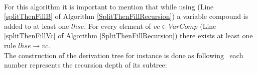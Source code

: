 \noindent
{}
\\
For this algorithm it is important to mention that while using  (Line \ref{splitThenFillB} of Algorithm \ref{SplitThenFillRecursion}) a variable compound is added to at least one $lhse$. For every element of $vc \in VarComp$ (Line \ref{splitThenFillVc} of Algorithm \ref{SplitThenFillRecursion}) there exists at least one rule $lhse \rightarrow vc$.\\
The construction of the derivation tree for instance is done as following \textendash~each number represents the recursion depth of its subtree: 
